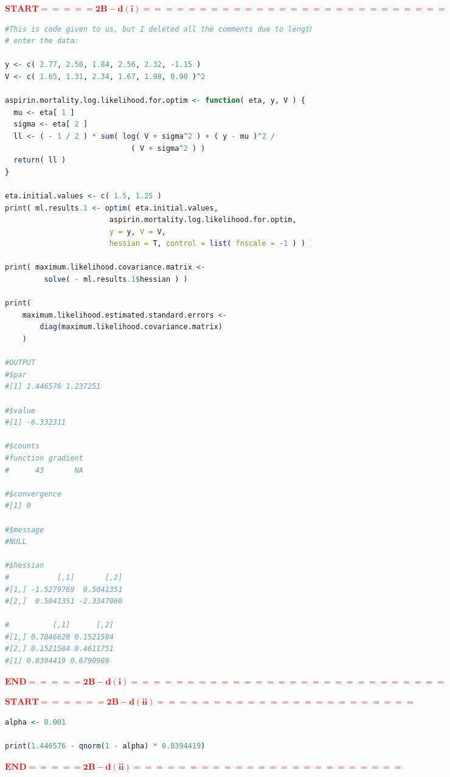 \documentclass[12pt]{article}
\newcommand{\tcr}[1]{\textcolor{red}{#1}}
\begin{document}
\vspace*{1in}
\tcr{$\bm{START ===== 2B - d(i) ============================}$}
\begin{lstlisting}[language = R]
#This is code given to us, but I deleted all the comments due to length
# enter the data:

y <- c( 2.77, 2.50, 1.84, 2.56, 2.32, -1.15 )
V <- c( 1.65, 1.31, 2.34, 1.67, 1.98, 0.90 )^2

aspirin.mortality.log.likelihood.for.optim <- function( eta, y, V ) {
  mu <- eta[ 1 ]
  sigma <- eta[ 2 ]
  ll <- ( - 1 / 2 ) * sum( log( V + sigma^2 ) + ( y - mu )^2 /
                             ( V + sigma^2 ) )
  return( ll )
} 

eta.initial.values <- c( 1.5, 1.25 )
print( ml.results.1 <- optim( eta.initial.values, 
                        aspirin.mortality.log.likelihood.for.optim, 
                        y = y, V = V, 
                        hessian = T, control = list( fnscale = -1 ) ) )

print( maximum.likelihood.covariance.matrix <- 
         solve( - ml.results.1$hessian ) )

print( 
    maximum.likelihood.estimated.standard.errors <- 
        diag(maximum.likelihood.covariance.matrix)  
    )
    
#OUTPUT
#$par
#[1] 1.446576 1.237251

#$value
#[1] -6.332311

#$counts
#function gradient 
#      43       NA 

#$convergence
#[1] 0

#$message
#NULL

#$hessian
#           [,1]       [,2]
#[1,] -1.5279769  0.5041351
#[2,]  0.5041351 -2.3347060

#          [,1]      [,2]
#[1,] 0.7046628 0.1521584
#[2,] 0.1521584 0.4611751
#[1] 0.8394419 0.6790988   
\end{lstlisting}
\tcr{$\bm{END ===== 2B - d(i) ============================}$}
\vspace*{1in}

\tcr{$\bm{START ====== 2B - d(ii) =======================} $}
\begin{lstlisting}[language = R]
alpha <- 0.001

print(1.446576 - qnorm(1 - alpha) * 0.8394419)
\end{lstlisting}
\tcr{$\bm{END ===== 2B - d(ii) ========================}$}
\vspace*{1in}
\end{document}
